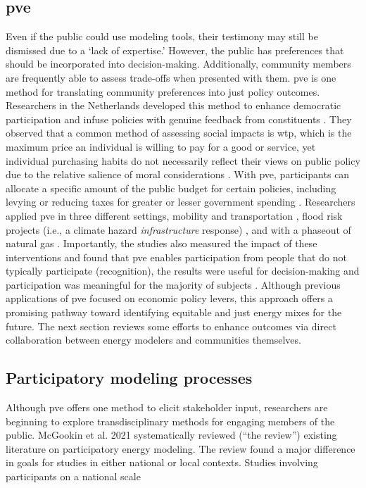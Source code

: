 \subsection{\Acl{pve}}

Even if the public could use modeling tools, their testimony may still be
dismissed due to a `lack of expertise.' However, the public has preferences that
should be incorporated into decision-making. Additionally, community members are
frequently able to assess trade-offs when presented with them. \Acf{pve} is one
method for translating community preferences into just policy outcomes.
Researchers in the Netherlands developed this method to enhance democratic
participation and infuse policies with genuine feedback from constituents
\cite{mouter_introduction_2019}. They observed that a common method of assessing
social impacts is \ac{wtp}, which is the maximum price an individual is willing
to pay for a good or service, yet individual purchasing habits do not
necessarily reflect their views on public policy due to the relative salience of
moral considerations \cite{mouter_introduction_2019}. With \ac{pve},
participants can allocate a specific amount of the public budget for certain
policies, including levying or reducing taxes for greater or lesser government
spending \cite{mouter_introduction_2019}. Researchers applied \ac{pve} in three
different settings, mobility and transportation \cite{mouter_contrasting_2021},
flood risk projects (i.e., a climate hazard \textit{infrastructure} response)
\cite{dekker_economics_2019}, and with a phaseout of natural gas
\cite{mouter_including_2021}. Importantly, the studies also measured the impact
of these interventions and found that \ac{pve} enables participation from people
that do not typically participate (recognition), the results were useful for
decision-making and participation was meaningful for the majority of subjects
\cite{mouter_including_2021}. Although previous applications of \ac{pve} focused
on economic policy levers, this approach offers a promising pathway toward
identifying equitable and just energy mixes for the future.
The next section reviews some efforts to enhance outcomes via direct collaboration 
between energy modelers and communities themselves.

\subsection{Participatory modeling processes}

Although \ac{pve} offers one method to elicit stakeholder input, researchers are
beginning to explore transdisciplinary methods for engaging members of the public.
McGookin et al. 2021 \cite{mcgookin_participatory_2021} systematically reviewed (``the review'') 
existing literature on participatory energy modeling. The review found a major
difference in goals for studies in either national or local contexts. Studies involving
participants on a national scale

